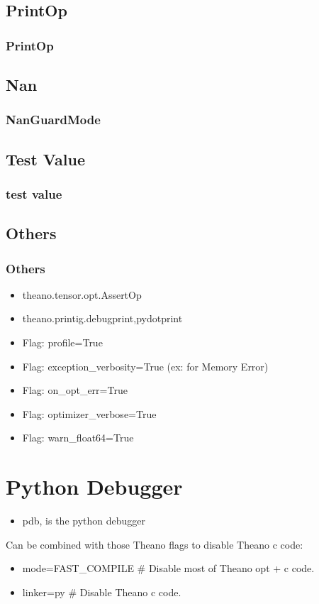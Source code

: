 \documentclass[utf8x,xcolor=pdftex,dvipsnames,table]{beamer}
\begin{document}
\subsection{PrintOp}
\begin{frame}
  \frametitle{PrintOp}
\end{frame}


\subsection{Nan}
\begin{frame}
  \frametitle{NanGuardMode}
\end{frame}

\subsection{Test Value}
\begin{frame}
  \frametitle{test value}
\end{frame}

\subsection{Others}
\begin{frame}
  \frametitle{Others}
  \begin{itemize}
  \item theano.tensor.opt.AssertOp
  \item theano.printig.{debugprint,pydotprint}


  \item Flag: profile=True
  \item Flag: exception\_verbosity=True (ex: for Memory Error)
  \item Flag: on\_opt\_err=True
  \item Flag: optimizer\_verbose=True
  \item Flag: warn\_float64=True
  \end{itemize}
\end{frame}

\section{Python Debugger}
\begin{frame}
  \begin{itemize}
  \item pdb, is the python debugger
  \end{itemize}

  Can be combined with those Theano flags to disable Theano c code:
  \begin{itemize}
    \item mode=FAST\_COMPILE \# Disable most of Theano opt + c code.
    \item linker=py \# Disable Theano c code.
  \end{itemize}
\end{frame}
\end{document}
